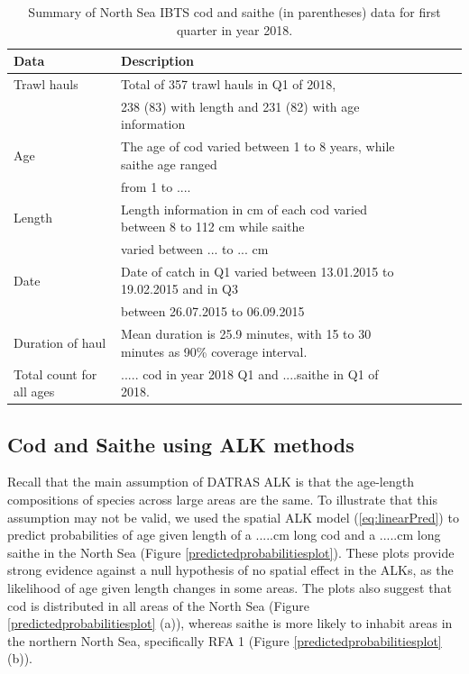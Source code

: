 \documentclass[a4paper 12pt]{article}
\numberwithin{equation}{section}
\begin{document}
\begin{small}
\begin{table}[h!]
\caption{Summary of North Sea IBTS cod and saithe (in parentheses) data for first quarter in year 2018.}
\begin{tabular}{llllll}
\toprule
\bf Data&\bf Description \\
\midrule
Trawl hauls  & Total of 357 trawl hauls in Q1 of 2018,   \\
&238 (83)  with length and 231 (82) with age information\\[1.3ex]
Age &The age of cod varied between 1 to 8 years, while saithe age ranged \\
& from 1 to .... \\[1.3ex]
Length & Length information in cm of each cod varied between 8 to 112 cm while saithe \\
& varied between ... to ... cm \\[1.3ex]
Date&Date of catch in Q1 varied between 13.01.2015 to 19.02.2015 and in Q3 \\
&between 26.07.2015 to 06.09.2015 \\[1.3ex]
Duration of haul & Mean duration is 25.9 minutes, with 15  to 30 minutes as 90\% coverage interval. \\[1.3ex]
Total count for all ages & ..... cod in year 2018 Q1 and ....saithe in Q1 of 2018. \\[0.5ex]
\bottomrule
\end{tabular}
\label{tab:data2018}
\end{table}
\end{small}




\subsection{Cod and Saithe using ALK methods}
\label{sec:codresults}

Recall that the main assumption of DATRAS ALK is that the age-length compositions of species across large areas are the same. To illustrate that this assumption may not be valid, we used  the spatial ALK model (\ref{eq:linearPred}) to predict probabilities of age given length of a .....cm long cod and a .....cm long saithe in the North Sea (Figure \ref{predictedprobabilitiesplot}). These plots provide strong evidence against a null hypothesis of no spatial effect in the ALKs, as the likelihood of age given length changes in some areas. The plots also suggest that cod is distributed in all areas of the North Sea (Figure \ref{predictedprobabilitiesplot} (a)), whereas saithe is more likely to inhabit areas in the northern North Sea, specifically RFA 1 (Figure \ref{predictedprobabilitiesplot} (b)).
\end{document}
